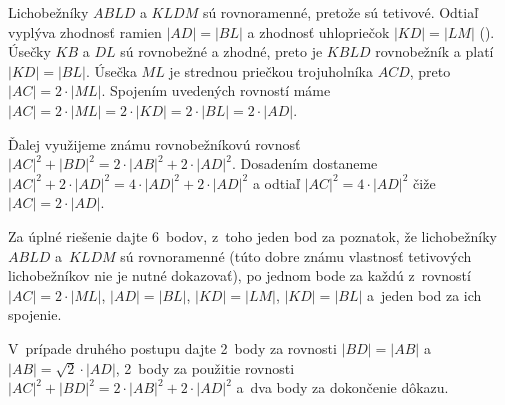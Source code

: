 {%
Lichobežníky $ABLD$ a $KLDM$ sú rovnoramenné, pretože sú tetivové. Odtiaľ vyplýva zhodnosť ramien $|AD|=|BL|$ a zhodnosť uhlopriečok $|KD|=|LM|$ (\obr). Úsečky $KB$ a $DL$ sú rovnobežné a zhodné, preto je $KBLD$ rovnobežník a platí
$|KD|=|BL|$. Úsečka $ML$ je strednou priečkou trojuholníka $ACD$, preto $|AC|=2\cdot|ML|$. Spojením uvedených rovností máme $|AC|=2\cdot|ML|=2\cdot|KD|=2\cdot|BL|=2\cdot|AD|$.
%

\ineriesenie
{}
Ďalej využijeme známu rovnobežníkovú rovnosť $|AC|^2+|BD|^2=2\cdot|AB|^2+2\cdot|AD|^2$. Dosadením dostaneme $|AC|^2+2\cdot|AD|^2=4\cdot|AD|^2+2\cdot|AD|^2$ a odtiaľ $|AC|^2=4\cdot|AD|^2$ čiže $|AC|=2\cdot|AD|$.

\nobreak\medskip\petit\noindent
Za úplné riešenie dajte 6~bodov, z~toho jeden bod za poznatok, že lichobežníky $ABLD$ a~$KLDM$ sú rovnoramenné (túto dobre známu vlastnosť tetivových lichobežníkov nie je nutné dokazovať), po jednom bode za každú z~rovností
$|AC|=2\cdot|ML|$, $|AD|=|BL|$, $|KD|=|LM|$, $|KD|=|BL|$ a~jeden bod za ich spojenie.

V~prípade druhého postupu dajte 2~body za rovnosti $|BD|=|AB|$ a~$|AB|=\sqrt2\cdot|AD|$, 2~body za použitie rovnosti $|AC|^2+|BD|^2=2\cdot|AB|^2+2\cdot|AD|^2$ a~dva body za dokončenie dôkazu.
\endpetit
\bigbreak
}

